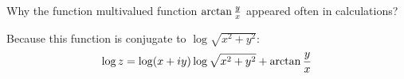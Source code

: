 
     Why the function multivalued function
$\arctan {y\over x}$
appeared often in calculations?

Because this function is conjugate to
$\log \sqrt {x^2+y^2}$:
           $$
\log z=\log (x+iy)\log \sqrt {x^2+y^2}
+\arctan {y\over x}
           $$


\bye  
